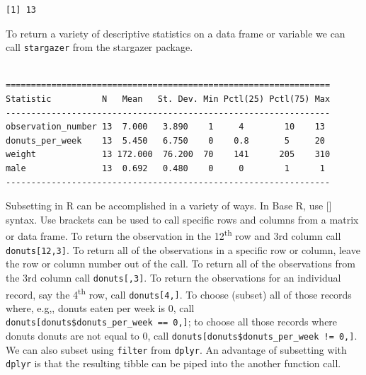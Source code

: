 \documentclass[]{book}
\newenvironment{Shaded}{\begin{snugshade}}{\end{snugshade}}
\newcommand{\DataTypeTok}[1]{\textcolor[rgb]{0.13,0.29,0.53}{#1}}
\newcommand{\KeywordTok}[1]{\textcolor[rgb]{0.13,0.29,0.53}{\textbf{#1}}}
\newcommand{\NormalTok}[1]{#1}
\newcommand{\OperatorTok}[1]{\textcolor[rgb]{0.81,0.36,0.00}{\textbf{#1}}}
\newcommand{\StringTok}[1]{\textcolor[rgb]{0.31,0.60,0.02}{#1}}
\begin{document}
\begin{verbatim}
[1] 13
\end{verbatim}

To return a variety of descriptive statistics on a data frame or variable we can call \texttt{stargazer} from the stargazer package.

\begin{Shaded}
\end{Shaded}

\begin{verbatim}

================================================================
Statistic          N   Mean   St. Dev. Min Pctl(25) Pctl(75) Max
----------------------------------------------------------------
observation_number 13  7.000   3.890    1     4        10    13 
donuts_per_week    13  5.450   6.750    0    0.8       5     20 
weight             13 172.000  76.200  70    141      205    310
male               13  0.692   0.480    0     0        1      1 
----------------------------------------------------------------
\end{verbatim}

Subsetting in R can be accomplished in a variety of ways. In Base R, use {[}{]} syntax. Use brackets can be used to call specific rows and columns from a matrix or data frame. To return the observation in the 12\textsuperscript{th} row and 3rd column call \texttt{donuts{[}12,3{]}}. To return all of the observations in a specific row or column, leave the row or column number out of the call. To return all of the observations from the 3rd column call \texttt{donuts{[},3{]}}. To return the observations for an individual record, say the 4\textsuperscript{th} row, call \texttt{donuts{[}4,{]}}. To choose (subset) all of those records where, e.g,, donuts eaten per week is 0, call \texttt{donuts{[}donuts\$donuts\_per\_week\ ==\ 0,{]}}; to choose all those records where donuts donuts are not equal to 0, call \texttt{donuts{[}donuts\$donuts\_per\_week\ !=\ 0,{]}}. We can also subset using \texttt{filter} from \texttt{dplyr}. An advantage of subsetting with \texttt{dplyr} is that the resulting tibble can be piped into the another function call.
\end{document}
